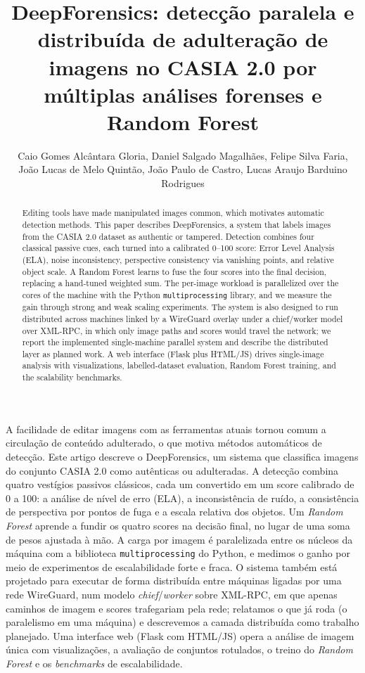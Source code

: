 \documentclass[12pt]{article}
\title{DeepForensics: detecção paralela e distribuída de adulteração de
  imagens no CASIA 2.0 por múltiplas análises forenses e Random Forest}
\author{Caio Gomes Alcântara Gloria\inst{1}, Daniel Salgado Magalhães\inst{1},
  Felipe Silva Faria\inst{1},\\ João Lucas de Melo Quintão\inst{1},
  João Paulo de Castro\inst{1}, Lucas Araujo Barduino Rodrigues\inst{1}}
\begin{document}
\maketitle

\begin{abstract}
  Editing tools have made manipulated images common, which motivates automatic
  detection methods. This paper describes DeepForensics, a system that labels
  images from the CASIA 2.0 dataset as authentic or tampered. Detection combines
  four classical passive cues, each turned into a calibrated 0--100 score:
  Error Level Analysis (ELA), noise inconsistency, perspective consistency via
  vanishing points, and relative object scale. A Random Forest learns to fuse
  the four scores into the final decision, replacing a hand-tuned weighted sum.
  The per-image workload is parallelized over the cores of the machine with the
  Python \texttt{multiprocessing} library, and we measure the gain through strong
  and weak scaling experiments. The system is also designed to run distributed
  across machines linked by a WireGuard overlay under a chief/worker model over
  XML-RPC, in which only image paths and scores would travel the network; we
  report the implemented single-machine parallel system and describe the
  distributed layer as planned work. A web interface (Flask plus HTML/JS) drives
  single-image analysis with visualizations, labelled-dataset evaluation, Random
  Forest training, and the scalability benchmarks.
\end{abstract}

\begin{resumo}
  A facilidade de editar imagens com as ferramentas atuais tornou comum a
  circulação de conteúdo adulterado, o que motiva métodos automáticos de
  detecção. Este artigo descreve o DeepForensics, um sistema que classifica
  imagens do conjunto CASIA 2.0 como autênticas ou adulteradas. A detecção
  combina quatro vestígios passivos clássicos, cada um convertido em um score
  calibrado de 0 a 100: a análise de nível de erro (ELA), a inconsistência de
  ruído, a consistência de perspectiva por pontos de fuga e a escala relativa
  dos objetos. Um \textit{Random Forest} aprende a fundir os quatro scores na
  decisão final, no lugar de uma soma de pesos ajustada à mão. A carga por
  imagem é paralelizada entre os núcleos da máquina com a biblioteca
  \texttt{multiprocessing} do Python, e medimos o ganho por meio de experimentos
  de escalabilidade forte e fraca. O sistema também está projetado para executar
  de forma distribuída entre máquinas ligadas por uma rede WireGuard, num modelo
  \textit{chief}/\textit{worker} sobre XML-RPC, em que apenas caminhos de imagem
  e scores trafegariam pela rede; relatamos o que já roda (o paralelismo em uma
  máquina) e descrevemos a camada distribuída como trabalho planejado. Uma
  interface web (Flask com HTML/JS) opera a análise de imagem única com
  visualizações, a avaliação de conjuntos rotulados, o treino do \textit{Random
  Forest} e os \textit{benchmarks} de escalabilidade.
\end{resumo}
\end{document}
